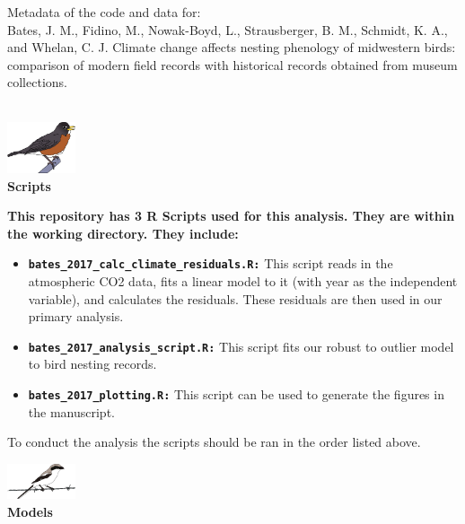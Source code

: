 \documentclass[10pt,a4paper]{article}
\begin{document}
 \large Metadata of the code and data for:\\

\normalsize
Bates, J. M., Fidino, M., Nowak-Boyd, L., Strausberger, B. M., Schmidt, K. A., and Whelan, C. J. Climate change affects nesting phenology of midwestern birds: comparison of modern field records with historical records obtained from museum collections.\\\\
\begin{center}
\includegraphics[width=0.15\textwidth]{american_robin.png}\\
\vspace{2mm}
\textbf{\Large Scripts}
\end{center}
\noindent\makebox[\linewidth]{\rule{\paperwidth}{0.4pt}}

\textbf{This repository has 3 R Scripts used for this analysis. They are within the working directory. They include:}\\

\begin{itemize}
\item  \textbf{\texttt{bates\_2017\_calc\_climate\_residuals.R:}} This script reads in the atmospheric CO2 data, fits a linear model to it (with year as the independent variable), and calculates the residuals.
These residuals are then used in our primary analysis.
\item \textbf{\texttt{bates\_2017\_analysis\_script.R:}} This script fits our robust to outlier model to bird nesting records.
\item \texttt{\textbf{bates\_2017\_plotting.R:}} This script can be used to generate the figures in the manuscript.
\end{itemize}
\vspace{3mm}
To conduct the analysis the scripts should be ran in the order listed above.\\
\noindent\makebox[\linewidth]{\rule{\paperwidth}{0.4pt}}

\begin{center}
\includegraphics[width=0.15\textwidth]{shrike.png}\\
\vspace{2mm}
\textbf{\Large Models}
\end{center}
\noindent\makebox[\linewidth]{\rule{\paperwidth}{0.4pt}}
\end{document}
